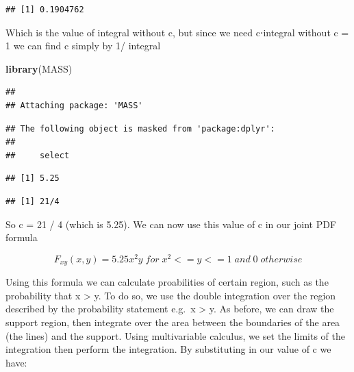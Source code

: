 \documentclass[]{book}
\newenvironment{Shaded}{\begin{snugshade}}{\end{snugshade}}
\newcommand{\KeywordTok}[1]{\textcolor[rgb]{0.13,0.29,0.53}{\textbf{#1}}}
\newcommand{\DecValTok}[1]{\textcolor[rgb]{0.00,0.00,0.81}{#1}}
\newcommand{\StringTok}[1]{\textcolor[rgb]{0.31,0.60,0.02}{#1}}
\newcommand{\OperatorTok}[1]{\textcolor[rgb]{0.81,0.36,0.00}{\textbf{#1}}}
\newcommand{\NormalTok}[1]{#1}
\theoremstyle{definition}
\theoremstyle{definition}
\theoremstyle{definition}
\theoremstyle{remark}
\begin{document}
\begin{verbatim}
## [1] 0.1904762
\end{verbatim}

Which is the value of integral without c, but since we need c⋅integral
without c = 1 we can find c simply by 1/ integral

\begin{Shaded}
\begin{Highlighting}[]
\KeywordTok{library}\NormalTok{(MASS)}
\end{Highlighting}
\end{Shaded}

\begin{verbatim}
## 
## Attaching package: 'MASS'
\end{verbatim}

\begin{verbatim}
## The following object is masked from 'package:dplyr':
## 
##     select
\end{verbatim}

\begin{Shaded}
\end{Shaded}

\begin{verbatim}
## [1] 5.25
\end{verbatim}

\begin{Shaded}
\end{Shaded}

\begin{verbatim}
## [1] 21/4
\end{verbatim}

So c = 21 / 4 (which is 5.25). We can now use this value of c in our
joint PDF formula

\[F_{xy}(x,y) = 5.25 x^2y \; for \; x^2 <= y <= 1 \; and \; 0 \; otherwise\]

Using this formula we can calculate proabilities of certain region, such
as the probability that x \textgreater{} y. To do so, we use the double
integration over the region described by the probability statement
e.g.~x \textgreater{} y. As before, we can draw the support region, then
integrate over the area between the boundaries of the area (the lines)
and the support. Using multivariable calculus, we set the limits of the
integration then perform the integration. By substituting in our value
of c we have:
\end{document}
